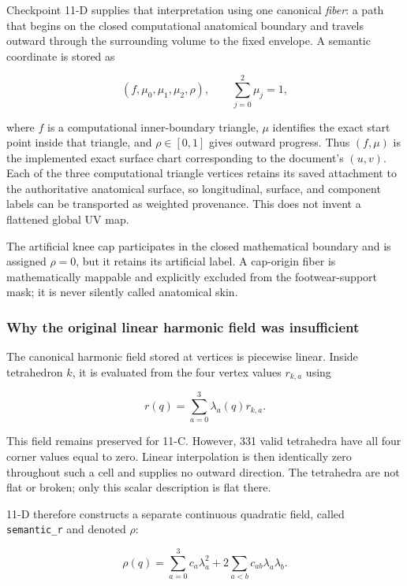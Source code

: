 \documentclass[11pt]{article}
\begin{document}
Checkpoint 11-D supplies that interpretation using one canonical \emph{fiber}: a path
that begins on the closed computational anatomical boundary and travels outward through
the surrounding volume to the fixed envelope. A semantic coordinate is stored as

\begin{equation}
  (f,\mu_0,\mu_1,\mu_2,\rho),
  \qquad \sum_{j=0}^{2}\mu_j=1,
  \label{eq:fiber-coordinate}
\end{equation}

where $f$ is a computational inner-boundary triangle, $\mu$ identifies the exact start
point inside that triangle, and $\rho\in[0,1]$ gives outward progress. Thus $(f,\mu)$ is
the implemented exact surface chart corresponding to the document's $(u,v)$. Each of
the three computational triangle vertices retains its saved attachment to the
authoritative anatomical surface, so longitudinal, surface, and component labels can be
transported as weighted provenance. This does not invent a flattened global UV map.

The artificial knee cap participates in the closed mathematical boundary and is assigned
$\rho=0$, but it retains its artificial label. A cap-origin fiber is mathematically
mappable and explicitly excluded from the footwear-support mask; it is never silently
called anatomical skin.

\subsubsection{Why the original linear harmonic field was insufficient}

The canonical harmonic field stored at vertices is piecewise linear. Inside tetrahedron
$k$, it is evaluated from the four vertex values $r_{k,a}$ using

\begin{equation}
  r(q)=\sum_{a=0}^{3}\lambda_a(q)r_{k,a}.
\end{equation}

This field remains preserved for 11-C. However, 331 valid tetrahedra have all four
corner values equal to zero. Linear interpolation is then identically zero throughout
such a cell and supplies no outward direction. The tetrahedra are not flat or broken;
only this scalar description is flat there.

11-D therefore constructs a separate continuous quadratic field, called
\texttt{semantic\_r} and denoted $\rho$:

\begin{equation}
  \rho(q)=\sum_{a=0}^{3}c_a\lambda_a^2
  +2\sum_{a<b}c_{ab}\lambda_a\lambda_b.
  \label{eq:quadratic-rho}
\end{equation}
\end{document}
